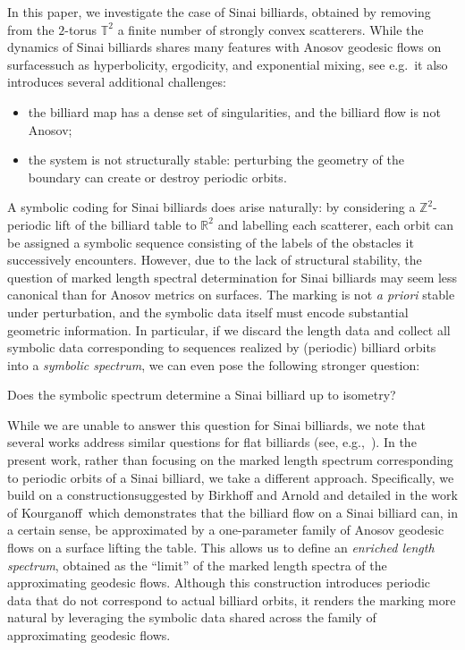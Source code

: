 \documentclass[reqno,11pt]{amsart}
\begin{document}
In this paper, we investigate the case of Sinai billiards, obtained by removing from the $2$-torus $\mathbb{T}^2$ a finite number of strongly convex scatterers. While the dynamics of Sinai billiards shares many features with Anosov geodesic flows on surfaces\textemdash such as hyperbolicity, ergodicity, and exponential mixing, see e.g.~\cite{chernov_chaotic_2006, baladi2018exponential}\textemdash it also introduces several additional challenges:
\begin{itemize}
\item the billiard map has a dense set of singularities, and the billiard flow is not Anosov;
\item the system is not structurally stable: perturbing the geometry of the boundary can create or destroy periodic orbits.
\end{itemize}
A symbolic coding for Sinai billiards does arise naturally: by considering a $\mathbb{Z}^2$-periodic lift of the billiard table to $\mathbb{R}^2$ and labelling each scatterer, each orbit can be assigned a symbolic sequence consisting of the labels of the obstacles it successively encounters.
However, due to the lack of structural stability, the question of marked length spectral determination for Sinai billiards may seem less canonical than for Anosov metrics on surfaces. The marking is not \textit{a priori} stable under perturbation, and the symbolic data itself must encode substantial geometric information. In particular, if we discard the length data and collect all symbolic data corresponding to sequences realized by (periodic) billiard orbits into a \emph{symbolic spectrum}, we can even pose the following stronger question:
\begin{question}
    Does the symbolic spectrum determine a Sinai billiard up to isometry? 
\end{question}
While we are unable to answer this question for Sinai billiards, we note that several works address similar questions for flat billiards (see, e.g.,~\cite{duchin2021you, calderon2018hear}).
In the present work, rather than focusing on the marked length spectrum corresponding to periodic orbits of a Sinai billiard, we take a different approach. Specifically, we build on a construction\textemdash suggested by Birkhoff and Arnold and detailed in the work of Kourganoff~\cite{kourganoff_anosov_2016}\textemdash which demonstrates that the billiard flow on a Sinai billiard can, in a certain sense, be approximated by a one-parameter family of Anosov geodesic flows on a surface lifting the table. This allows us to define an \emph{enriched length spectrum}, obtained as the ``limit'' of the marked length spectra of the approximating geodesic flows. Although this construction introduces periodic data that do not correspond to actual billiard orbits, it renders the marking more natural by leveraging the symbolic data shared across the family of approximating geodesic flows.
\end{document}
